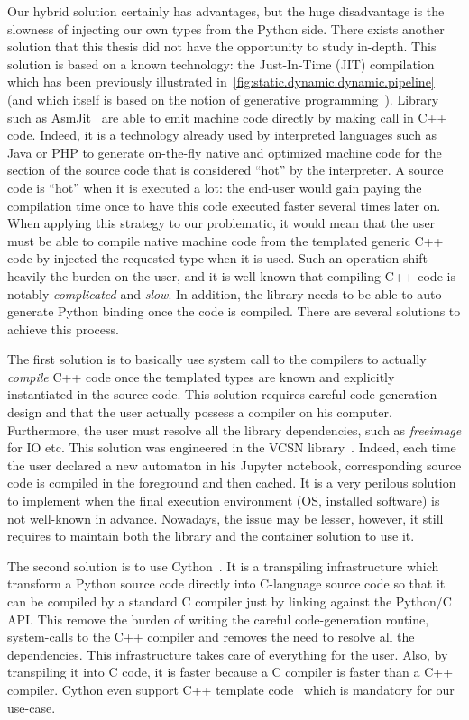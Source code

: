 Our hybrid solution certainly has advantages, but the huge disadvantage is the slowness of injecting our own types from
the Python side. There exists another solution that this thesis did not have the opportunity to study in-depth. This
solution is based on a known technology: the Just-In-Time (JIT) compilation which has been previously illustrated
in~\cref{fig:static.dynamic.dynamic.pipeline} (and which itself is based on the notion of generative
programming~\parencite{czarnecki.2000.generative}). Library such as AsmJit~\parencite{kobalicek.2011.asmjit} are able to
emit machine code directly by making call in C++ code. Indeed, it is a technology already used by interpreted languages
such as Java or PHP to generate on-the-fly native and optimized machine code for the section of the source code that is
considered ``hot'' by the interpreter. A source code is ``hot'' when it is executed a lot: the end-user would gain
paying the compilation time once to have this code executed faster several times later on. When applying this strategy
to our problematic, it would mean that the user must be able to compile native machine code from the templated generic
C++ code by injected the requested type when it is used. Such an operation shift heavily the burden on the user, and it
is well-known that compiling C++ code is notably \emph{complicated} and \emph{slow}. In addition, the library needs to
be able to auto-generate Python binding once the code is compiled. There are several solutions to achieve this process.

The first solution is to basically use system call to the compilers to actually \emph{compile} C++ code once the
templated types are known and explicitly instantiated in the source code. This solution requires careful code-generation
design and that the user actually possess a compiler on his computer. Furthermore, the user must resolve all the
library dependencies, such as \emph{freeimage} for IO etc. This solution was engineered in the VCSN
library~\parencite{demaille.2013.vcsn}. Indeed, each time the user declared a new automaton in his Jupyter notebook,
corresponding source code is compiled in the foreground and then cached. It is a very perilous solution to implement
when the final execution environment (OS, installed software) is not well-known in advance. Nowadays, the issue may be
lesser, however, it still requires to maintain both the library and the container solution to use it.

The second solution is to use Cython~\parencite{behnel.2010.cython}. It is a transpiling infrastructure which transform
a Python source code directly into C-language source code so that it can be compiled by a standard C compiler just by
linking against the Python/C API. This remove the burden of writing the careful code-generation routine, system-calls
to the C++ compiler and removes the need to resolve all the dependencies. This infrastructure takes care of everything
for the user. Also, by transpiling it into C code, it is faster because a C compiler is faster than a C++ compiler.
Cython even support C++ template code~\parencite{behnel.2022.cython-template} which is mandatory for our use-case.

